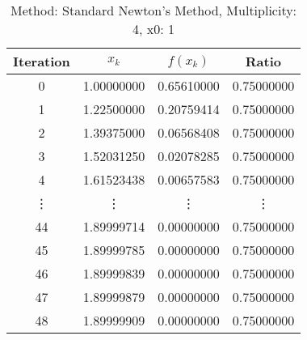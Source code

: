 \begin{table}
\centering
\caption{Method: Standard Newton's Method, Multiplicity: 4, x0: 1}
\label{tab:table_Standard_Newton's_Method_4_1}
\begin{tabular}{c c c c}
\toprule
Iteration &      $x_k$ &   $f(x_k)$ &      Ratio \\
\midrule
        0 & 1.00000000 & 0.65610000 & 0.75000000 \\
        1 & 1.22500000 & 0.20759414 & 0.75000000 \\
        2 & 1.39375000 & 0.06568408 & 0.75000000 \\
        3 & 1.52031250 & 0.02078285 & 0.75000000 \\
        4 & 1.61523438 & 0.00657583 & 0.75000000 \\
   \vdots &     \vdots &     \vdots &     \vdots \\
       44 & 1.89999714 & 0.00000000 & 0.75000000 \\
       45 & 1.89999785 & 0.00000000 & 0.75000000 \\
       46 & 1.89999839 & 0.00000000 & 0.75000000 \\
       47 & 1.89999879 & 0.00000000 & 0.75000000 \\
       48 & 1.89999909 & 0.00000000 & 0.75000000 \\
\bottomrule
\end{tabular}
\end{table}
